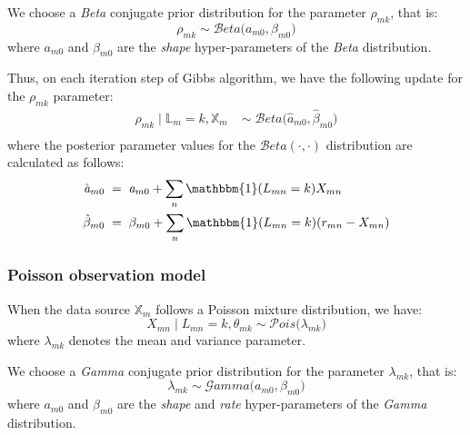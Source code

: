 We choose a \emph{Beta} conjugate prior distribution for the parameter $\rho_{mk}$, that is:
\begin{equation}
	\rho_{mk} \sim \mathcal{B}eta\big(\mathit{a}_{m0}, \beta_{m0}\big)
\end{equation}
where $\mathit{a}_{m0}$ and $\beta_{m0}$ are the \emph{shape} hyper-parameters of the \emph{Beta} distribution.

Thus, on each iteration step of Gibbs algorithm, we have the following update for the $\rho_{mk}$ parameter:
\begin{equation}
  \begin{aligned}
  	\rho_{mk} \mid \mathbb{L}_{m}=k, \mathbb{X}_{m} \;& \sim \;\mathcal{B}eta\big(\hat{\mathit{a}}_{m0}, \hat{\beta}_{m0}\big) \\
  \end{aligned}
\end{equation}
where the posterior parameter values for the $\mathcal{B}eta(\cdot,\cdot)$ distribution are calculated as follows:
\begin{equation}
  \begin{aligned}
  	\hat{\mathit{a}}_{m0} \; &= \; \mathit{a}_{m0} + \sum_{n}\mathbbm{1}(L_{mn}=k)X_{mn} \\
  	\hat{\beta}_{m0} \; &= \; \beta_{m0} +  \sum_{n}\mathbbm{1}(L_{mn}=k)(r_{mn} - X_{mn})
  \end{aligned}
\end{equation}

\subsubsection*{Poisson observation model}
When the data source $\mathbb{X}_{m}$ follows a Poisson mixture distribution, we have:
\begin{equation}
	X_{mn} \mid L_{mn} = k, \theta_{mk} \sim \mathcal{P}ois\big(\lambda_{mk}\big)
\end{equation}
where $\lambda_{mk}$ denotes the mean and variance parameter.

We choose a \emph{Gamma} conjugate prior distribution for the parameter $\lambda_{mk}$, that is:
\begin{equation}
	\lambda_{mk} \sim \mathcal{G}amma\big(\mathit{a}_{m0}, \beta_{m0}\big)
\end{equation}
where $\mathit{a}_{m0}$ and $\beta_{m0}$ are the \emph{shape} and \emph{rate} hyper-parameters of the \emph{Gamma} distribution.

